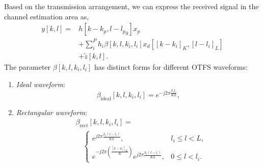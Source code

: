 \documentclass[journal]{IEEEtran}
\begin{document}
Based on the transmission arrangement, we can express the received signal in the channel estimation area as,
\begin{equation}
\begin{split}
y[k, l] = &h[k - k_p, l-{l_p}_0]x_p \\
& + \sum_i^P h_i \beta[k, l, k_i, l_i] x_d[[k-k_i]_K, [l-l_i]_L]\\
& + \tilde{z}[k, l].
\end{split}
\label{eq:JPICNet-CPE-rxSigCHE}
\end{equation}
%
The parameter $\beta[k, l, k_i, l_i]$ has distinct forms for different OTFS waveforms:
\begin{enumerate}
	\renewcommand{\labelenumi}{\roman{enumi})} %
    \item \textit{Ideal waveform}:
    \begin{equation}
        \beta_{\text{ideal}}[k, l, k_i, l_i] = e^{-j2\pi \frac{k_i l_i}{KL}},
    \end{equation}
    \item \textit{Rectangular waveform}:
    \begin{equation}
    \begin{split}
        & \beta_{\text{rect}}[k, l, k_i, l_i] =  \\
        & \hspace{1em}\begin{cases}
            e^{j2\pi \frac{k_i(l-l_i)}{KL}}, & l_i \leq l < L, \\
            e^{-j2\pi \left(\frac{[k-k_i]_K}{K}\right)} e^{j2\pi \frac{k_i(l-l_i)}{KL}}, & 0 \leq l < l_i.
        \end{cases}
    \end{split}
    \end{equation}
\end{enumerate}
\end{document}
